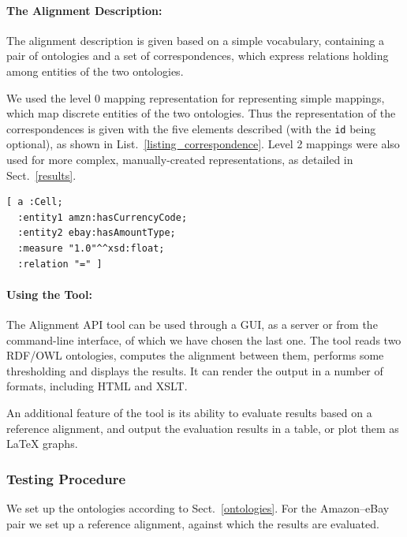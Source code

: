 \paragraph{The Alignment Description:} 
The alignment description is given based on a simple vocabulary, containing a pair of ontologies and a set of correspondences, which express relations holding among entities of the two ontologies.

We used the level 0 mapping representation for representing simple mappings, which map discrete entities of the two ontologies. Thus the representation of the correspondences is given with the five elements described (with the \texttt{id} being optional), as shown in List.~\ref{listing_correspondence}. Level 2 mappings were also used for more complex, manually-created representations, as detailed in Sect.~\ref{results}.

\begin{center}
\lstset{frame=single, basicstyle=\small}
\lstset{caption=Level 0 mapping element example, label=listing_correspondence}
\lstset{captionpos=b}
\lstset{language=XML}
\begin{lstlisting}
[ a :Cell;
  :entity1 amzn:hasCurrencyCode;
  :entity2 ebay:hasAmountType;
  :measure "1.0"^^xsd:float;
  :relation "=" ]
\end{lstlisting}
\end{center}

\paragraph{Using the Tool:}
The Alignment API tool can be used through a GUI, as a server or from the command-line interface, of which we have chosen the last one. The tool reads two RDF/OWL ontologies, computes the alignment between them, performs some thresholding and displays the results. It can render the output in a number of formats, including HTML and XSLT.
 
An additional feature of the tool is its ability to evaluate results based on a reference alignment, and output the evaluation results in a table, or plot them as \LaTeX{} graphs.

\subsubsection{Testing Procedure}
We set up the ontologies according to Sect.~\ref{ontologies}. For the Amazon--eBay pair we set up a reference alignment, against which the results are evaluated.

